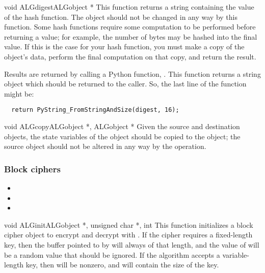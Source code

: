 \documentclass{howto}
\begin{document}
\begin{funcdesc}{void ALGdigest}{\rm ALGobject *}
This function returns a string containing the value of the hash
function.  The object should not be changed in any way by this
function.  Some hash functions require some computation to be
performed before returning a value; for example, the number of bytes
may be hashed into the final value.  If this is the case for your hash
function, you must make a copy of the object's data, perform the final
computation on that copy, and return the result.
\end{funcdesc}

Results are returned by calling a Python function,
.  This
function returns a string object which should be returned to the
caller.  So, the last line of the 
function might be:
\begin{verbatim}
  return PyString_FromStringAndSize(digest, 16);
\end{verbatim}


\begin{funcdesc}{void ALGcopy}{\rm ALGobject *, ALGobject *}
Given the source and destination objects, the state variables of the
 object should be copied to the  object; the
source object should not be altered in any way by the operation.
\end{funcdesc}

\subsubsection{Block ciphers}
\begin{itemize}
\item {}
\item {}
\item {}
\end{itemize}

\begin{funcdesc}{void ALGinit}{\rm ALGobject *, unsigned char *, int }
This function initializes a block cipher object to encrypt and decrypt
with .  If the cipher requires a fixed-length key, then the
buffer pointed to by  will always of that length, and the
value of  will be a random value that should be ignored.
If the algorithm accepts a variable-length key, then  will
be nonzero, and will contain the size of the key.
\end{funcdesc}
\end{document}
